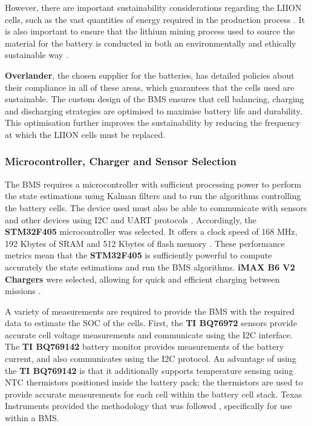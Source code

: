 However, there are important sustainability considerations regarding the \acrshort{LIION} cells, such as the vast quantities of energy required in the production process \cite{environments12010024}. It is also important to ensure that the lithium mining process used to source the material for the battery is conducted in both an environmentally and ethically sustainable way \cite{EnergyFuturesLab_2022}. 

\textbf{Overlander}, the chosen supplier for the batteries, has detailed policies about their compliance in all of these areas, which guarantees that the cells used are sustainable. The custom design of the \gls{BMS} ensures that cell balancing, charging and discharging strategies are optimised to maximise battery life and durability. This optimisation further improves the sustainability by reducing the frequency at which the \acrshort{LIION} cells must be replaced. 

\subsubsection{Microcontroller, Charger and Sensor Selection}
\label{microcon}

The \acrshort{BMS} requires a microcontroller with sufficient processing power to perform the state estimations using Kalman filters and to run the algorithms controlling the battery cells. The device used must also be able to communicate with sensors and other devices using \gls{I2C} and \gls{UART} protocols \cite{Denggao2022}. Accordingly, the \textbf{STM32F405} microcontroller was selected. It offers a clock speed of 168 MHz, 192 Kbytes of \gls{SRAM} and 512 Kbytes of flash memory \cite{st_dm00037051}. These performance metrics mean that the \textbf{STM32F405} is sufficiently powerful to compute accurately the state estimations and run the \acrshort{BMS} algorithms. \textbf{iMAX B6 V2 Chargers} were selected, allowing for quick and efficient charging between missions \cite{digikey_prt16793}.

A variety of measurements are required to provide the \acrshort{BMS} with the required data to estimate the \gls{SOC} of the cells. First, the \textbf{TI BQ76972} sensors provide accurate cell voltage measurements and communicate using the \acrshort{I2C} interface. The \textbf{TI BQ769142} battery monitor provides measurements of the battery current, and also communicates using the \acrshort{I2C} protocol. An advantage of using the \textbf{TI BQ769142} is that it additionally supports temperature sensing using \gls{NTC} thermistors positioned inside the battery pack; the thermistors are used to provide accurate measurements for each cell within the battery cell stack. Texas Instruments provided the methodology that was followed \cite{TI_SNIA032}, specifically for use within a \gls{BMS}.

